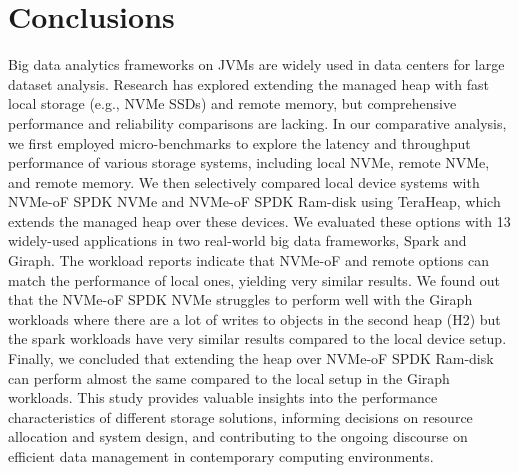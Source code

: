 \section{Conclusions}
Big data analytics frameworks on JVMs are widely used in data centers for large dataset analysis. Research has explored extending the managed heap with fast local storage (e.g., NVMe SSDs) and remote memory, but comprehensive performance and reliability comparisons are lacking. In our comparative analysis, we first employed micro-benchmarks to explore the latency and throughput performance of various storage systems, including local NVMe, remote NVMe, and remote memory. We then selectively compared local device systems with NVMe-oF SPDK NVMe and NVMe-oF SPDK Ram-disk using TeraHeap, which extends the managed heap over these devices. We evaluated these options with 13 widely-used applications in two real-world big data frameworks, Spark and Giraph. The workload reports indicate that NVMe-oF and remote options can match the performance of local ones, yielding very similar results. We found out that the NVMe-oF SPDK NVMe struggles to perform well with the Giraph workloads where there are a lot of writes to objects in the second heap (H2) but the spark workloads have very similar results compared to the local device setup. Finally, we concluded that extending the heap over NVMe-oF SPDK Ram-disk can perform almost the same compared to the local setup in the Giraph workloads. This study provides valuable insights into the performance characteristics of different storage solutions, informing decisions on resource allocation and system design, and contributing to the ongoing discourse on efficient data management in contemporary computing environments.